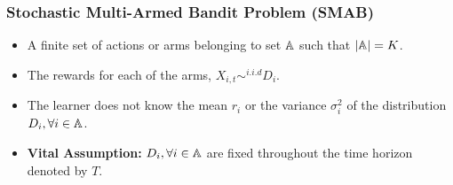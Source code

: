 \begin{frame}
\frametitle{Stochastic Multi-Armed Bandit Problem (SMAB)}
\begin{itemize}
\item<1-> A finite set of actions or arms belonging to set $\mathbb{A}$ such that $|\mathbb{A}|=K$. 
\item<2-> The rewards for each of the arms, $X_{i,t}\sim^{i.i.d} D_i$. 
\item<3-> The learner does not know the mean $r_{i}$  or the variance $\sigma_i^2$ of the distribution $D_i,\forall i\in \mathbb{A}$. 
\item<4-> \textbf{Vital Assumption:} $D_i,\forall i\in\mathbb{A}$ are fixed throughout the time horizon denoted by $T$.
\end{itemize}
\end{frame}



